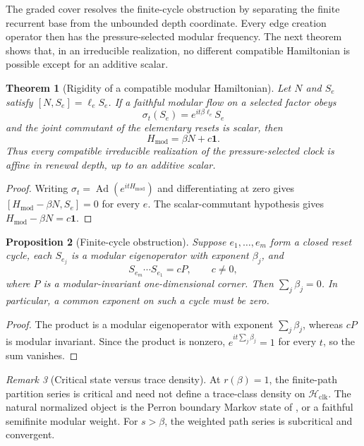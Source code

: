 \documentclass[11pt]{article}
\newtheorem{theorem}{Theorem}[section]
\newtheorem{proposition}[theorem]{Proposition}
\theoremstyle{definition}
\theoremstyle{remark}
\newtheorem{remark}[theorem]{Remark}
\newcommand{\one}{\mathbf 1}
\newcommand{\Ad}{\operatorname{Ad}}
\newcommand{\Hh}{\mathcal H}
\begin{document}
The graded cover resolves the finite-cycle obstruction by separating the finite
recurrent base from the unbounded depth coordinate.  Every edge creation operator
then has the pressure-selected modular frequency.  The next theorem shows that,
in an irreducible realization, no different compatible Hamiltonian is possible
except for an additive scalar.

\begin{theorem}[Rigidity of a compatible modular Hamiltonian]
\label{thm:affine-clock}
Let $N$ and $S_e$ satisfy $[N,S_e]=\ell_eS_e$.  If a faithful modular flow on
a selected factor obeys
\[
 \sigma_t(S_e)=e^{it\beta\ell_e}S_e
\]
and the joint commutant of the elementary resets is scalar, then
\[
 H_{\mathrm{mod}}=\beta N+c\one.
\]
Thus every compatible irreducible realization of the pressure-selected clock
is affine in renewal depth, up to an additive scalar.
\end{theorem}

\begin{proof}
Writing $\sigma_t=\Ad(e^{itH_{\mathrm{mod}}})$ and differentiating at zero gives
$[H_{\mathrm{mod}}-\beta N,S_e]=0$ for every $e$.  The scalar-commutant
hypothesis gives $H_{\mathrm{mod}}-\beta N=c\one$.
\end{proof}

\begin{proposition}[Finite-cycle obstruction]
\label{prop:finite-cycle-clock-obstruction}
Suppose $e_1,\ldots,e_m$ form a closed reset cycle, each $S_{e_j}$ is a modular
eigenoperator with exponent $\beta_j$, and
\[
 S_{e_m}\cdots S_{e_1}=cP,
 \qquad c\ne0,
\]
where $P$ is a modular-invariant one-dimensional corner.  Then
$\sum_j\beta_j=0$.  In particular, a common exponent on such a cycle must be
zero.
\end{proposition}

\begin{proof}
The product is a modular eigenoperator with exponent $\sum_j\beta_j$, whereas
$cP$ is modular invariant.  Since the product is nonzero,
$e^{it\sum_j\beta_j}=1$ for every $t$, so the sum vanishes.
\end{proof}

\begin{remark}[Critical state versus trace density]
At $r(\beta)=1$, the finite-path partition series is critical and need not
define a trace-class density on $\Hh_{\mathrm{clk}}$.  The natural normalized
object is the Perron boundary Markov state of
, or a faithful semifinite modular weight.  For
$s>\beta$, the weighted path series is subcritical and convergent.
\end{remark}
\end{document}

